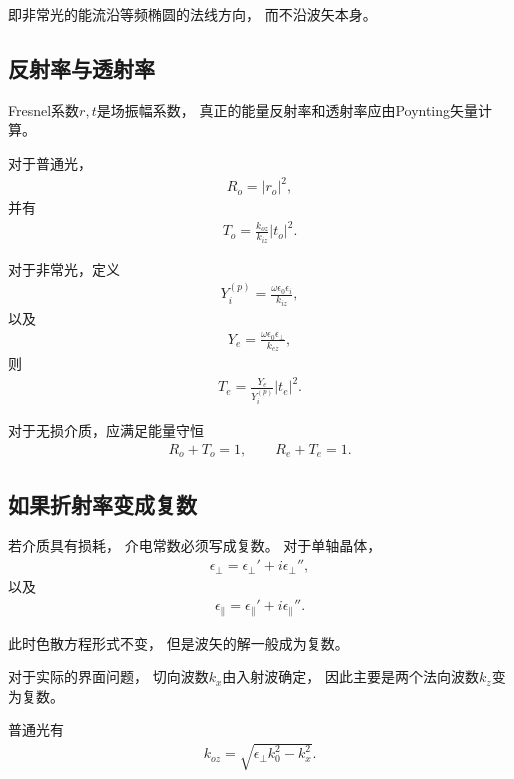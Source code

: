 \documentclass{article}
\begin{document}
即非常光的能流沿等频椭圆的法线方向，
而不沿波矢本身。

\subsection{反射率与透射率}

Fresnel系数$r,t$是场振幅系数，
真正的能量反射率和透射率应由Poynting矢量计算。

对于普通光，
\begin{align}
    R_o=|r_o|^2,
\end{align}
并有
\begin{align}
    \boxed{
    T_o
    =
    \frac{k_{oz}}{k_{iz}}
    |t_o|^2
    }.
\end{align}

对于非常光，定义
\begin{align}
    Y_i^{(p)}
    =
    \frac{\omega\epsilon_0\epsilon_i}{k_{iz}},
\end{align}
以及
\begin{align}
    Y_e
    =
    \frac{\omega\epsilon_0\epsilon_\perp}{k_{ez}},
\end{align}
则
\begin{align}
    \boxed{
    T_e
    =
    \frac{Y_e}{Y_i^{(p)}}
    |t_e|^2
    }.
\end{align}

对于无损介质，应满足能量守恒
\begin{align}
    \boxed{
    R_o+T_o=1,
    \qquad
    R_e+T_e=1
    }.
\end{align}

\subsection{如果折射率变成复数}

若介质具有损耗，
介电常数必须写成复数。
对于单轴晶体，
\begin{align}
    \epsilon_\perp
    =
    \epsilon_\perp'
    +
    i\epsilon_\perp'',
\end{align}
以及
\begin{align}
    \epsilon_\parallel
    =
    \epsilon_\parallel'
    +
    i\epsilon_\parallel''.
\end{align}

此时色散方程形式不变，
但是波矢的解一般成为复数。

对于实际的界面问题，
切向波数$k_x$由入射波确定，
因此主要是两个法向波数$k_z$变为复数。

普通光有
\begin{align}
    \boxed{
    k_{oz}
    =
    \sqrt{
    \epsilon_\perp k_0^2-k_x^2
    }
    }.
\end{align}
\end{document}
